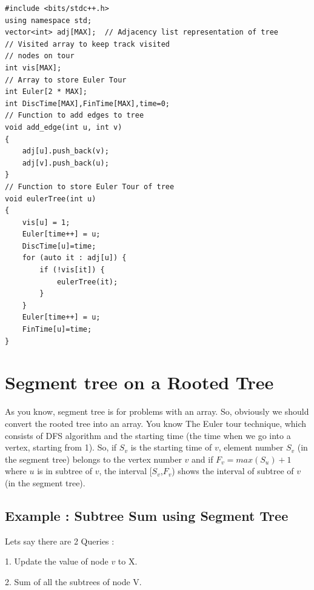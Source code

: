 \documentclass[12pt]{article}
\begin{document}
\begin{verbatim}
#include <bits/stdc++.h> 
using namespace std; 
vector<int> adj[MAX];  // Adjacency list representation of tree 
// Visited array to keep track visited 
// nodes on tour 
int vis[MAX]; 
// Array to store Euler Tour 
int Euler[2 * MAX]; 
int DiscTime[MAX],FinTime[MAX],time=0;
// Function to add edges to tree 
void add_edge(int u, int v) 
{ 
	adj[u].push_back(v); 
	adj[v].push_back(u); 
} 
// Function to store Euler Tour of tree 
void eulerTree(int u) 
{ 
	vis[u] = 1; 
	Euler[time++] = u; 
	DiscTime[u]=time;
	for (auto it : adj[u]) { 
		if (!vis[it]) { 
			eulerTree(it);
		} 
	} 
	Euler[time++] = u; 
	FinTime[u]=time;
} 
\end{verbatim}
\section{Segment tree on a Rooted Tree}
As you know, segment tree is for problems with an array. So, obviously we should convert the rooted tree into an array. You know The Euler tour technique, which consists of DFS algorithm and the starting time (the time when we go into a vertex, starting from 1). So, if $S_v$ is the starting time of $v$, element number $S_v$ (in the segment tree) belongs to the vertex number $v$ and if $F_v=max(S_u)+1$ where $u$ is in subtree of $v$, the interval [$S_v$,$F_v$) shows the interval of subtree of $v$ (in the segment tree). \cite{5} 
\subsection{Example : Subtree Sum using Segment Tree}

Lets say there are 2 Queries :

1. Update the value of node $v$ to X.

2. Sum of all the subtrees of node V.
\end{document}
